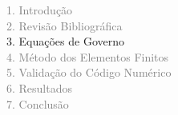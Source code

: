 
\begin{frame}
  \vspace{-1cm}
  \textcolor{gray}{1. Introdução}\\[0.1cm]
  \textcolor{gray}{2. Revisão Bibliográfica}\\[0.1cm]
  3. Equações de Governo\\[0.1cm]
  \textcolor{gray}{4. Método dos Elementos Finitos}\\[0.1cm]
  \textcolor{gray}{5. Validação do Código Numérico}\\[0.1cm]
  \textcolor{gray}{6. Resultados}\\[0.1cm]
  \textcolor{gray}{7. Conclusão}
\end{frame}



